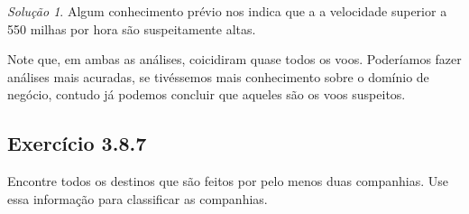 \documentclass[
]{latex/krantz}
\theoremstyle{definition}
\theoremstyle{definition}
\theoremstyle{definition}
\theoremstyle{definition}
\theoremstyle{remark}
\newtheorem*{solution}{Solução}
\begin{document}
\begin{solution}
Algum conhecimento prévio nos indica que a a velocidade superior a 550 milhas por hora são suspeitamente altas.

Note que, em ambas as análises, coicidiram quase todos os voos. Poderíamos fazer análises mais acuradas, se tivéssemos mais conhecimento sobre o domínio de negócio, contudo já podemos concluir que aqueles são os voos suspeitos.
\end{solution}

\hypertarget{exr3-8-7}{%
\subsection*{Exercício 3.8.7}\label{exr3-8-7}}

Encontre todos os destinos que são feitos por pelo menos duas companhias. Use essa informação para classificar as companhias.
\end{document}
